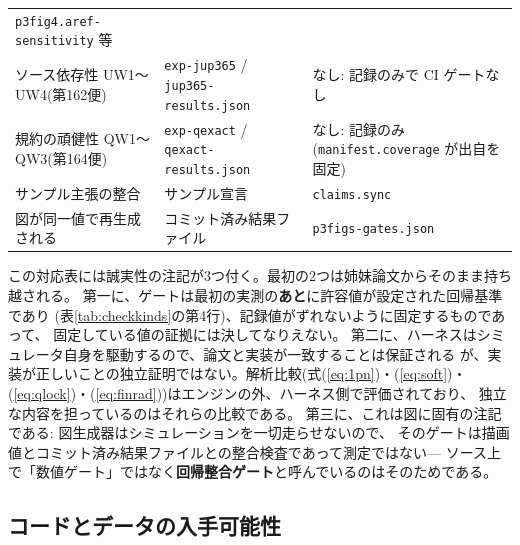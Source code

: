 \documentclass[a4paper,10pt,twocolumn]{ltjsarticle}
\begin{document}
\begin{center}
{\begin{tabularx}{\columnwidth}{@{}YYY@{}}
  \texttt{p3fig4.\allowbreak aref-sensitivity} 等 \\
ソース依存性 UW1〜UW4(第162便) &
  \texttt{exp-jup365} / \texttt{jup365-\allowbreak results.json} &
  なし: 記録のみで CI ゲートなし \\
規約の頑健性 QW1〜QW3(第164便) &
  \texttt{exp-qexact} / \texttt{qexact-\allowbreak results.json} &
  なし: 記録のみ(\texttt{manifest.\allowbreak coverage} が出自を固定) \\
サンプル主張の整合 & サンプル宣言 & \texttt{claims.sync} \\
図が同一値で再生成される & コミット済み結果ファイル &
  \texttt{p3figs-\allowbreak gates.json} \\
\bottomrule
\end{tabularx}}
\end{center}

この対応表には誠実性の注記が3つ付く。最初の2つは姉妹論文からそのまま持ち越される。
第一に、ゲートは最初の実測の\textbf{あと}に許容値が設定された回帰基準であり
(表\ref{tab:checkkinds}の第4行)、記録値がずれないように固定するものであって、
固定している値の証拠には決してなりえない。
第二に、ハーネスはシミュレータ自身を駆動するので、論文と実装が一致することは保証される
が、実装が正しいことの独立証明ではない。解析比較(式(\ref{eq:1pn})・(\ref{eq:soft})・
(\ref{eq:qlock})・(\ref{eq:finrad}))はエンジンの外、ハーネス側で評価されており、
独立な内容を担っているのはそれらの比較である。
第三に、これは図に固有の注記である: 図生成器はシミュレーションを一切走らせないので、
そのゲートは描画値とコミット済み結果ファイルとの整合検査であって測定ではない---
ソース上で「数値ゲート」ではなく\textbf{回帰整合ゲート}と呼んでいるのはそのためである。

\subsection{コードとデータの入手可能性}
\label{sec:avail}
\end{document}
